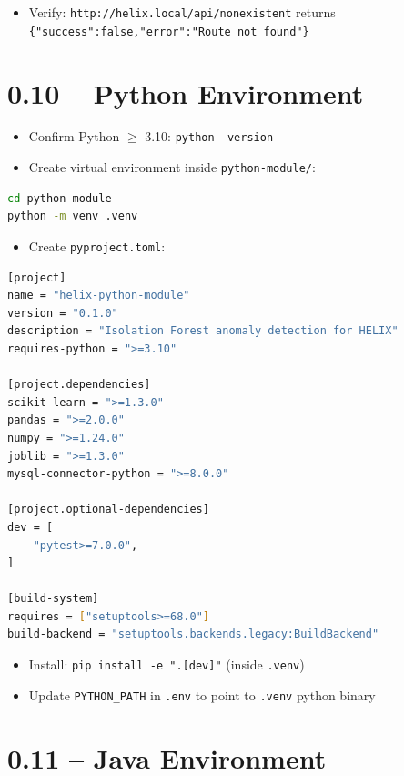 \documentclass[11pt,a4paper]{report}
\newcommand{\todo}{\textcolor{helixamber}{\textbf{[ ]}}}
\newcommand{\filepath}[1]{\texttt{\small#1}}
\begin{document}
\begin{itemize}
    \item[\todo] Verify: \texttt{http://helix.local/api/nonexistent} returns \texttt{\{"success":false,"error":"Route not found"\}}
\end{itemize}

\section{0.10 -- Python Environment}

\begin{itemize}
    \item[\todo] Confirm Python $\geq$ 3.10: \texttt{python --version}
    \item[\todo] Create virtual environment inside \filepath{python-module/}:
\end{itemize}

\begin{lstlisting}[language=bash]
cd python-module
python -m venv .venv
\end{lstlisting}

\begin{itemize}
    \item[\todo] Create \filepath{pyproject.toml}:
\end{itemize}

\begin{lstlisting}[language=bash]
[project]
name = "helix-python-module"
version = "0.1.0"
description = "Isolation Forest anomaly detection for HELIX"
requires-python = ">=3.10"

[project.dependencies]
scikit-learn = ">=1.3.0"
pandas = ">=2.0.0"
numpy = ">=1.24.0"
joblib = ">=1.3.0"
mysql-connector-python = ">=8.0.0"

[project.optional-dependencies]
dev = [
    "pytest>=7.0.0",
]

[build-system]
requires = ["setuptools>=68.0"]
build-backend = "setuptools.backends.legacy:BuildBackend"
\end{lstlisting}

\begin{itemize}
    \item[\todo] Install: \texttt{pip install -e ".[dev]"} (inside \texttt{.venv})
    \item[\todo] Update \texttt{PYTHON\_PATH} in \filepath{.env} to point to \texttt{.venv} python binary
\end{itemize}

\section{0.11 -- Java Environment}
\end{document}
